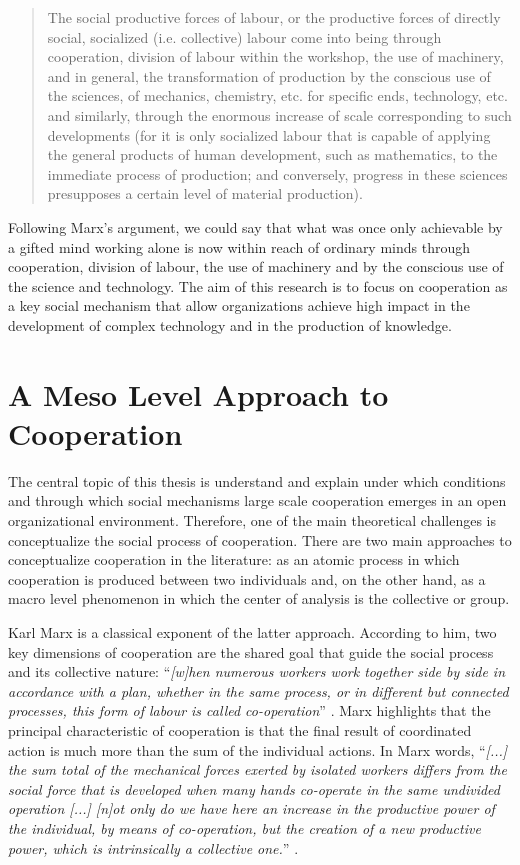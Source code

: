 \begin{quote}
The social productive forces of labour, or the productive forces of directly social, socialized (i.e. collective) labour come into being through cooperation, division of labour within the workshop, the use of machinery, and in general, the transformation of production by the conscious use of the sciences, of mechanics, chemistry, etc. for specific ends, technology, etc. and similarly, through the enormous increase of scale corresponding to such developments (for it is only socialized labour that is capable of applying the general products of human development, such as mathematics, to the immediate process of production; and conversely, progress in these sciences presupposes a certain level of material production). \citep[1024]{marx:1990}
\end{quote}

Following Marx's argument, we could say that what was once only achievable by a gifted mind working alone is now within reach of ordinary minds through cooperation, division of labour, the use of machinery and by the conscious use of the science and technology. The aim of this research is to focus on cooperation as a key social mechanism that allow organizations achieve high impact in the development of complex technology and in the production of knowledge.

\section{A Meso Level Approach to Cooperation}

The central topic of this thesis is understand and explain under which conditions and through which social mechanisms large scale cooperation emerges in an open organizational environment. Therefore, one of the main theoretical challenges is conceptualize the social process of cooperation. There are two main approaches to conceptualize cooperation in the literature: as an atomic process in which cooperation is produced between two individuals and, on the other hand, as a macro level phenomenon in which the center of analysis is the collective or group.

Karl Marx is a classical exponent of the latter approach. According to him, two key dimensions of cooperation are the shared goal that guide the social process and its collective nature: ``\emph{[w]hen numerous workers work together side by side in accordance with a plan, whether in the same process, or in different but connected processes, this form of labour is called co-operation}'' \citep[443]{marx:1990}. Marx highlights that the principal characteristic of cooperation is that the final result of coordinated action is much more than the sum of the individual actions. In Marx words, ``\emph{[...] the sum total of the mechanical forces exerted by isolated workers differs from the social force that is developed when many hands co-operate in the same undivided operation [...] [n]ot only do we have here an increase in the productive power of the individual, by means of co-operation, but the creation of a new productive power, which is intrinsically a collective one.}'' \citep[443]{marx:1990}.

